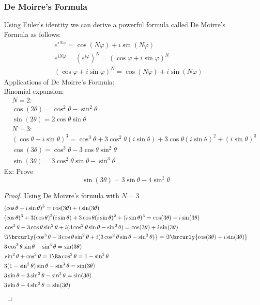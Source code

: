 \subsubsection{De Moirre's Formula}
Using Euler's identity we can derive a powerful formula called De Moirre's Formula as follows:
\begin{align*}
    &e^{iN\varphi}=\cos(N\varphi)+i\sin(N\varphi)\\
    &e^{iN\varphi}=(e^{i\varphi})^N=(\cos\varphi+i\sin\varphi)^N\\
    &(\cos\varphi+i\sin\varphi)^N=\cos(N\varphi)+i\sin(N\varphi)
\end{align*}
Applications of De Moirre's Formula:\\
Binomial expansion:
\begin{align*}
    &N=2:\\
    &\cos(2\theta)=\cos^2\theta-\sin^2\theta\\
    &\sin(2\theta)=2\cos\theta\sin\theta\\
    &N=3:\\
    &(\cos\theta+i\sin\theta)^3=\cos^3\theta+3\cos^2\theta(i\sin\theta)+3\cos\theta(i\sin\theta)^2+(i\sin\theta)^3\\
    &\cos(3\theta)=\cos^3\theta-3\cos\theta\sin^2\theta\\
    &\sin(3\theta)=3\cos^2\theta\sin\theta-\sin^3\theta
\end{align*}
Ex: Prove
\[ \sin(3\theta)=3\sin\theta-4\sin^3\theta \]
\begin{proof}
Using De Moivre's formula with $N=3$
\begin{align*}
    &(\cos\theta+i\sin\theta)^3=\cos(3\theta)+i\sin(3\theta)\\
    &(\cos\theta)^3+3(\cos\theta)^2(i\sin\theta)+3\cos\theta(i\sin\theta)^2+(i\sin\theta)^3=\cos(3\theta)+i\sin(3\theta)\\
    &\cos^3\theta-3\cos\theta\sin^2\theta+i(3\cos^2\theta\sin\theta-\sin^3\theta)=\cos(3\theta)+i\sin(3\theta)\\
    &\Im\brcurly{\cos^3\theta-3\cos\theta\sin^2\theta+i(3\cos^2\theta\sin\theta-\sin^3\theta)}=\Im\brcurly{\cos(3\theta)+i\sin(3\theta)}\\
    &3\cos^2\theta\sin\theta-\sin^3\theta=\sin(3\theta)\\
    &\sin^2\theta+\cos^2\theta=1\Ra \cos^2\theta=1-\sin^2\theta\\
    &3(1-\sin^2\theta)\sin\theta-\sin^3\theta=\sin(3\theta)\\
    &3\sin\theta-3\sin^3\theta-\sin^3\theta=\sin(3\theta)\\
    &3\sin\theta-4\sin^3\theta=\sin(3\theta)
\end{align*}
\end{proof}
